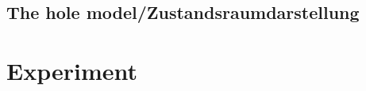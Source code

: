     \subsection{The hole model/Zustandsraumdarstellung}
    \label{holeModel}
    
\section{Experiment}
\label{thermalmodel}





